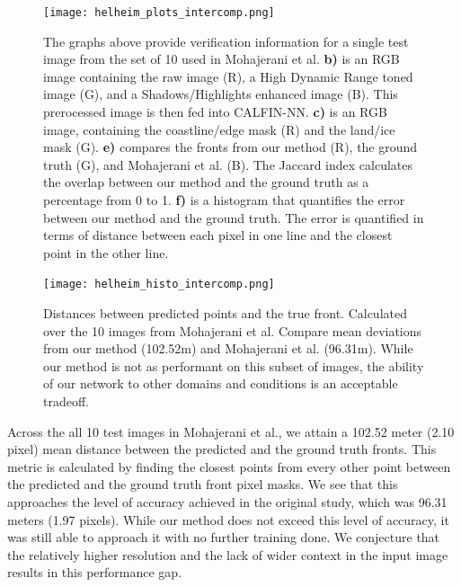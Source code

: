 \documentclass[tc, manuscript]{copernicus}
\begin{document}
\begin{figure}[t]
\texttt{[image: helheim\_plots\_intercomp.png]}
\caption{The graphs above provide verification information for a single test image from the set of 10 used in Mohajerani et al. \textbf{b)} is an RGB image containing the raw image (R), a High Dynamic Range toned image (G), and a Shadows/Highlights enhanced image (B). This prerocessed image is then fed into CALFIN-NN. \textbf{c)} is an RGB image, containing the coastline/edge mask (R) and the land/ice mask (G). \textbf{e)} compares the fronts from our method (R), the ground truth (G), and Mohajerani et al. (B). The Jaccard index calculates the overlap between our method and the ground truth as a percentage from 0 to 1. \textbf{f)} is a histogram that quantifies the error between our method and the ground truth. The error is quantified in terms of distance between each pixel in one line and the closest point in the other line.}
\centering
\end{figure}

\begin{figure}[t]
\texttt{[image: helheim\_histo\_intercomp.png]}
\caption{Distances between predicted points and the true front. Calculated over the 10 images from Mohajerani et al. Compare mean deviations from our method (102.52m) and Mohajerani et al. (96.31m). While our method is not as performant on this subset of images, the ability of our network to other domains and conditions is an acceptable tradeoff.}
\centering
\end{figure}

Across the all 10 test images in Mohajerani et al., we attain a 102.52 meter (2.10 pixel) mean distance between the predicted and the ground truth fronts. This metric is calculated by finding the closest points from every other point between the predicted and the ground truth front pixel masks. We see that this approaches the level of accuracy achieved in the original study, which was 96.31 meters (1.97 pixels). While our method does not exceed this level of accuracy, it was still able to approach it with no further training done. We conjecture that the relatively higher resolution and the lack of wider context in the input image results in this performance gap.
\end{document}
